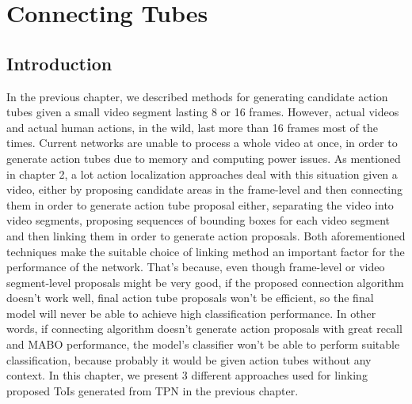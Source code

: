 





% 

\chapter{Connecting Tubes}
\section{Introduction}
In the previous chapter, we described methods for generating candidate action tubes given a small video segment lasting 8 or 16 frames. However, actual videos
and actual human actions, in the  wild, last more than 16 frames most of the times. Current networks are unable to process a whole video at once, in order to generate action tubes
due to memory and computing power issues.  As mentioned in chapter 2, a lot action localization approaches deal with this situation given a video, either by 
proposing candidate areas in the frame-level and then  connecting them in order to generate action tube proposal either, separating the video into video segments,
proposing  sequences of bounding boxes for each video segment and then linking them in order to generate action proposals. Both aforementioned techniques make
the suitable choice of linking method an important factor for the performance of the network. That's because, even though frame-level or video segment-level proposals
might be very good, if the proposed connection algorithm doesn't work well, final action tube proposals won't be efficient, so the final model will never
be able to achieve high classification performance. In other words, if connecting algorithm doesn't generate action proposals with great recall and MABO performance,
the model's classifier won't be able to perform suitable classification, because probably it would be given action tubes without any context.
In this chapter, we present 3 different approaches used for linking proposed ToIs generated from TPN in the previous chapter.

